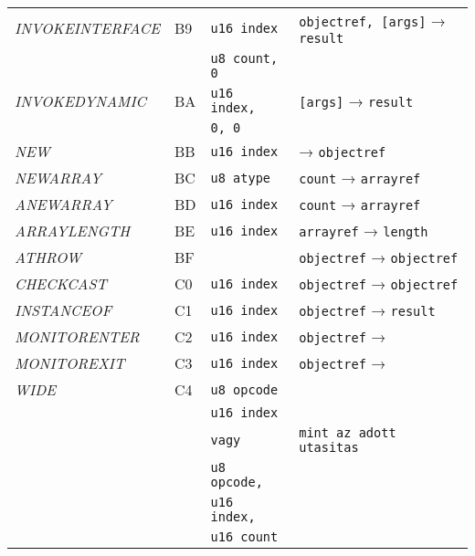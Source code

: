 \begin{center}
\begin{longtable}{ | p{} | p{} | p{} | p{} | }
        \emph{INVOKEINTERFACE}
		& B9 & \lstinline|u16 index| & \lstinline|objectref, [args]| → \lstinline|result| \\
        & & \lstinline|u8 count, 0| &
		\\ \hline

        \emph{INVOKEDYNAMIC}
		& BA & \lstinline|u16 index, | & \lstinline|[args]| → \lstinline|result| \\
        & & \lstinline|0, 0| &
		\\ \hline

        \emph{NEW}
		& BB & \lstinline|u16 index| & → \lstinline|objectref|
		\\ \hline

        \emph{NEWARRAY}
		& BC & \lstinline|u8 atype| & \lstinline|count| → \lstinline|arrayref|
		\\ \hline

        \emph{ANEWARRAY}
		& BD & \lstinline|u16 index| & \lstinline|count| → \lstinline|arrayref|
		\\ \hline

        \emph{ARRAYLENGTH}
		& BE & \lstinline|u16 index| & \lstinline|arrayref| → \lstinline|length|
		\\ \hline

        \emph{ATHROW}
		& BF & & \lstinline|objectref| → \lstinline|objectref|
		\\ \hline

        \emph{CHECKCAST}
		& C0 & \lstinline|u16 index| & \lstinline|objectref| → \lstinline|objectref|
		\\ \hline

        \emph{INSTANCEOF}
		& C1 & \lstinline|u16 index| & \lstinline|objectref| → \lstinline|result|
		\\ \hline

        \emph{MONITORENTER}
		& C2 & \lstinline|u16 index| & \lstinline|objectref| →
		\\ \hline

        \emph{MONITOREXIT}
		& C3 & \lstinline|u16 index| & \lstinline|objectref| →
		\\ \hline

        \emph{WIDE}
		& C4 & \lstinline|u8 opcode| & \\
        & & \lstinline|u16 index| & \\
        & & \lstinline|vagy| & \lstinline|mint az adott utasitas| \\
        & & \lstinline|u8 opcode,| & \\
        & & \lstinline|u16 index,| & \\
        & & \lstinline|u16 count| & 
		\\ \hline


\end{longtable}
\end{center}
